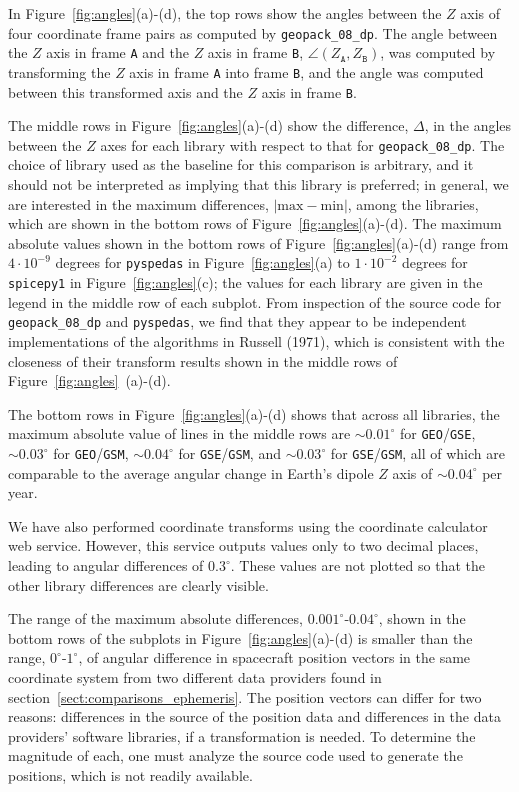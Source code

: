 \documentclass[draft]{agujournal2019}
\begin{document}
In Figure~\ref{fig:angles}(a)-(d), the top rows show the angles between the $Z$ axis of four coordinate frame pairs as computed by \texttt{geopack\_08\_dp}. The angle between the $Z$ axis in frame \texttt{A} and the $Z$ axis in frame \texttt{B}, $\angle (Z_\mathtt{A}, Z_\mathtt{B})$, was computed by transforming the $Z$ axis in frame \texttt{A} into frame \texttt{B}, and the angle was computed between this transformed axis and the $Z$ axis in frame \texttt{B}. 

The middle rows in Figure~\ref{fig:angles}(a)-(d) show the difference, $\Delta$, in the angles between the $Z$ axes for each library with respect to that for \texttt{geopack\_08\_dp}. The choice of library used as the baseline for this comparison is arbitrary, and it should not be interpreted as implying that this library is preferred; in general, we are interested in the maximum differences, $|\mbox{max}-\mbox{min}|$, among the libraries, which are shown in the bottom rows of Figure~\ref{fig:angles}(a)-(d). The maximum absolute values shown in the bottom rows of Figure~\ref{fig:angles}(a)-(d) range from $4\cdot 10^{-9}$ degrees for \texttt{pyspedas} in Figure~\ref{fig:angles}(a) to $1\cdot 10^{-2}$ degrees for \texttt{spicepy1} in Figure~\ref{fig:angles}(c); the values for each library are given in the legend in the middle row of each subplot. From inspection of the source code for \texttt{geopack\_08\_dp} and \texttt{pyspedas}, we find that they appear to be independent implementations of the algorithms in Russell (1971), which is consistent with the closeness of their transform results shown in the middle rows of Figure~\ref{fig:angles}~(a)-(d).

The bottom rows in Figure~\ref{fig:angles}(a)-(d) shows that across all libraries, the maximum absolute value of lines in the middle rows are ${\sim}0.01^\circ$ for \texttt{GEO}/\texttt{GSE}, ${\sim} 0.03^\circ$ for \texttt{GEO}/\texttt{GSM}, ${\sim}0.04^\circ$ for \texttt{GSE}/\texttt{GSM}, and ${\sim}0.03^\circ$ for \texttt{GSE}/\texttt{GSM}, all of which are comparable to the average angular change in Earth's dipole $Z$ axis of ${\sim}0.04^\circ$ per year.

We have also performed coordinate transforms using the  coordinate calculator web service. However, this service outputs values only to two decimal places, leading to angular differences of $0.3^\circ$. These values are not plotted so that the other library differences are clearly visible.

The range of the maximum absolute differences, $0.001^\circ$-$0.04^\circ$, shown in the bottom rows of the subplots in Figure~\ref{fig:angles}(a)-(d) is smaller than the range, $0^\circ$-$1^\circ$, of angular difference in spacecraft position vectors in the same coordinate system from two different data providers found in section~\ref{sect:comparisons_ephemeris}. The position vectors can differ for two reasons: differences in the source of the position data and differences in the data providers' software libraries, if a transformation is needed. To determine the magnitude of each, one must analyze the source code used to generate the positions, which is not readily available.
\end{document}
